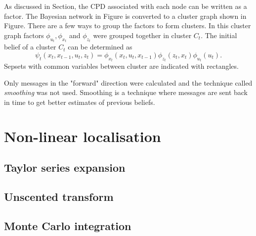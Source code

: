 \documentclass[12pt,oneside,openany,a4paper, %
afrikaans,english,
]{memoir}
\numberwithin{equation}{chapter}
\begin{document}
As discussed in Section, the CPD associated with each node can be written as a factor. The Bayesian network in Figure is converted to a cluster graph shown in Figure. There are a few ways to group the factors to form clusters. In this cluster graph factors $\phi_{u_t}, \phi_{x_t}$ and $\phi_{z_t}$ were grouped together in cluster $C_t$. The initial belief of a cluster $C_t$ can be determined as
\begin{equation}
\psi_t(x_t, x_{t-1}, u_t, z_t) = \phi_{x_t}(x_t,u_t,x_{t-1})\phi_{z_t}(z_t,x_t)\phi_{u_t}(u_t).
\end{equation}
Sepsets with common variables between cluster are indicated with rectangles.

Only messages in the "forward" direction were calculated and the technique called \textit{smoothing} was not used. Smoothing is a technique where messages are sent back in time to get better estimates of previous beliefs.
\section{Non-linear localisation}
\subsection{Taylor series expansion}
\subsection{Unscented transform}
\subsection{Monte Carlo integration}

\backmatter
{}
\end{document}

